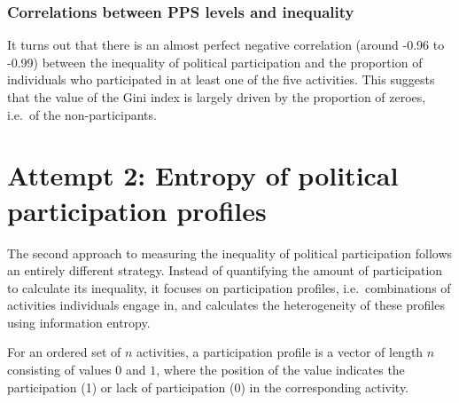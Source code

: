 \documentclass[12pt,]{article}
\begin{document}
\hypertarget{correlations-between-pps-levels-and-inequality}{%
\subsubsection{Correlations between PPS levels and inequality}\label{correlations-between-pps-levels-and-inequality}}

It turns out that there is an almost perfect negative correlation (around -0.96 to -0.99) between the inequality of political participation and the proportion of individuals who participated in at least one of the five activities. This suggests that the value of the Gini index is largely driven by the proportion of zeroes, i.e.~of the non-participants.

\hypertarget{attempt-2-entropy-of-political-participation-profiles}{%
\section{Attempt 2: Entropy of political participation profiles}\label{attempt-2-entropy-of-political-participation-profiles}}

The second approach to measuring the inequality of political participation follows an entirely different strategy. Instead of quantifying the amount of participation to calculate its inequality, it focuses on participation profiles, i.e.~combinations of activities individuals engage in, and calculates the heterogeneity of these profiles using information entropy.

For an ordered set of \(n\) activities, a participation profile is a vector of length \(n\) consisting of values \(0\) and \(1\), where the position of the value indicates the participation (1) or lack of participation (0) in the corresponding activity.

\begin{table}[H]

\caption{\label{tab:ess-part-profile}Creating participation profiles, example.}
\centering
{}
\end{table}
\end{document}
